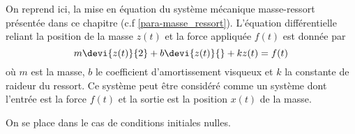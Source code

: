 \clearpage
On reprend ici, la mise en équation du système mécanique masse-ressort 
présentée dans ce chapitre (c.f \cref{para-masse_ressort}). L'équation 
différentielle reliant la position de la masse $z(t)$ et 
la force appliquée $f(t)$ est donnée par 
\[
m\devi{z(t)}{2}+b\devi{z(t)}{}+kz(t)=f(t)
\]
où $m$ est la masse, $b$ le coefficient d'amortissement visqueux et $k$ la
constante de raideur du ressort. Ce système peut être considéré comme
un système dont l'entrée est la force $f(t)$ et la sortie est la position
$x(t)$ de la masse.
\begin{marginfigure}
    \centering
    
\end{marginfigure}
On se place dans le cas de conditions initiales nulles. 

